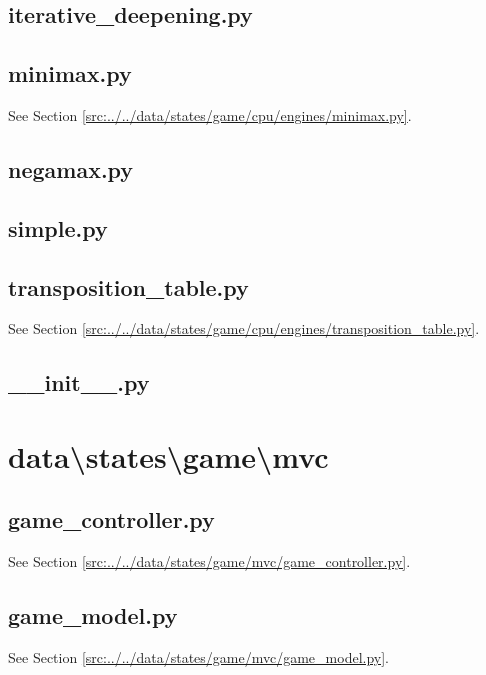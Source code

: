 \documentclass[../main/main.tex]{subfiles}
\begin{document}
\subsection{iterative\_deepening.py}

\label{src:data/states/game/cpu/engines/iterative_deepening.py}

\subsection{minimax.py}
See Section \ref{src:../../data/states/game/cpu/engines/minimax.py}.

\subsection{negamax.py}

\label{src:data/states/game/cpu/engines/negamax.py}

\subsection{simple.py}

\label{src:data/states/game/cpu/engines/simple.py}

\subsection{transposition\_table.py}
See Section \ref{src:../../data/states/game/cpu/engines/transposition_table.py}.

\subsection{\_\_init\_\_.py}

\label{src:data/states/game/cpu/engines/__init__.py}

\section{data\textbackslash states\textbackslash game\textbackslash mvc}
\subsection{game\_controller.py}
See Section \ref{src:../../data/states/game/mvc/game_controller.py}.

\subsection{game\_model.py}
See Section \ref{src:../../data/states/game/mvc/game_model.py}.
\end{document}
